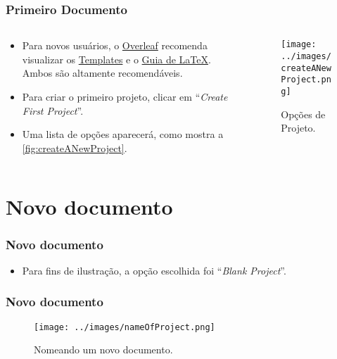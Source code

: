 \documentclass{beamer}
\begin{document}
    \begin{frame}
        \frametitle{Primeiro Documento}
    \begin{columns}
        \begin{column}{0.5\textwidth}
            \begin{itemize}
                \item Para novos usuários, o \href{https://www.overleaf.com/}{Overleaf} recomenda visualizar os \href{https://www.overleaf.com/latex/templates}{Templates} e o \href{https://www.overleaf.com/learn}{Guia de \LaTeX}. Ambos são altamente recomendáveis. 
                \item Para criar o primeiro projeto, clicar em ``\textit{Create First Project}''.
                \item Uma lista de opções aparecerá, como mostra a \autoref{fig:createANewProject}.
            \end{itemize} 
        \end{column}
        \begin{column}{0.5\textwidth}
            \begin{figure}
                \centering
                \caption{Opções de Projeto.}
                \label{fig:createANewProject}
                \texttt{[image: ../images/createANewProject.png]}
            \end{figure}
        \end{column}
    \end{columns}  
    \end{frame}

    \section{Novo documento}

    \begin{frame}
        \frametitle{Novo documento}
    \begin{itemize}
        \item Para fins de ilustração, a opção escolhida foi ``\textit{Blank Project}''.
    \end{itemize}
        
    
    \end{frame}

    \begin{frame}
        \frametitle{Novo documento}
        \begin{figure}
            \centering
            \caption{Nomeando um novo documento.}
            \label{fig:nameOfProject}
            \texttt{[image: ../images/nameOfProject.png]}
        \end{figure}
    \end{frame}
\end{document}
